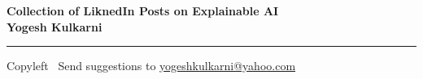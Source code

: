 
\graphicspath{{images/}}

\footnotesize


\begin{center}
\Large{\textbf{Collection of LiknedIn Posts on Explainable AI\\ Yogesh Kulkarni}}  
\end{center}

\begin{multicols}{2}

\end{multicols}

\rule{\linewidth}{0.25pt}
\scriptsize
Copyleft \textcopyleft\  Send suggestions to 
\href{http://www.yogeshkulkarni.com}{yogeshkulkarni@yahoo.com}


